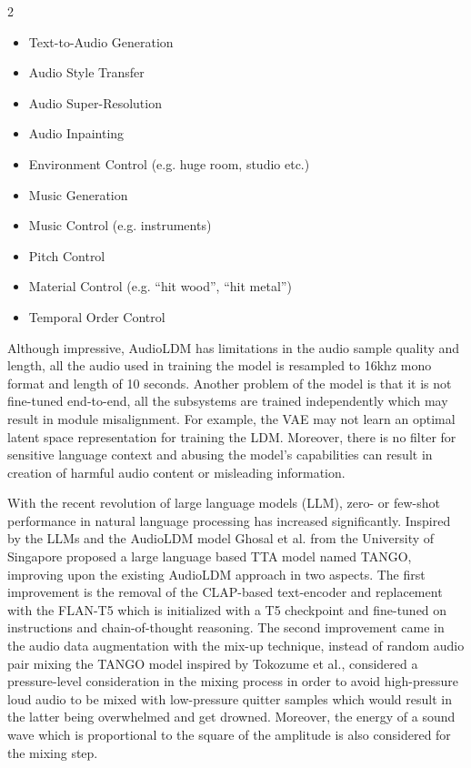 \documentclass[a4paper,one side,12pt]{book}
\begin{document}
\begin{multicols}{2}
\begin{itemize}
\item
    Text-to-Audio Generation
\item
    Audio Style Transfer
\item   
    Audio Super-Resolution
\item    
    Audio Inpainting
\item    
    Environment Control (e.g. huge room, studio etc.)
\item
	Music Generation
\item
	Music Control (e.g. instruments)
\item	
    Pitch Control
\item    
	Material Control (e.g. “hit wood”, “hit metal”)
\item	
    Temporal Order Control

\end{itemize}
\end{multicols}

Although impressive, AudioLDM has limitations in the audio sample
quality and length, all the audio used in training the model is
resampled to 16khz mono format and length of 10 seconds. Another problem
of the model is that it is not fine-tuned end-to-end, all the subsystems
are trained independently which may result in module misalignment. For
example, the VAE may not learn an optimal latent space representation
for training the LDM. Moreover, there is no filter for sensitive
language context and abusing the model's capabilities can result in
creation of harmful audio content or misleading information.

With the recent revolution of large language models (LLM), zero- or
few-shot performance in natural language processing has increased
significantly. Inspired by the LLMs and the AudioLDM model Ghosal et al.
\cite{ghosal_2023_texttoaudio} from the University of Singapore proposed a large language
based TTA model named TANGO, improving upon the existing AudioLDM
approach in two aspects. The first improvement is the removal of the
CLAP-based text-encoder and replacement with the FLAN-T5\cite{chung_2022_scaling} which
is initialized with a T5 checkpoint and fine-tuned on instructions and
chain-of-thought reasoning. The second improvement came in the audio
data augmentation with the mix-up technique, instead of random audio
pair mixing the TANGO model inspired by Tokozume et al.\cite{tokozume_2018_learning},
considered a pressure-level consideration in the mixing process in order
to avoid high-pressure loud audio to be mixed with low-pressure quitter
samples which would result in the latter being overwhelmed and get
drowned. Moreover, the energy of a sound wave which is proportional to
the square of the amplitude is also considered for the mixing step.
\end{document}

